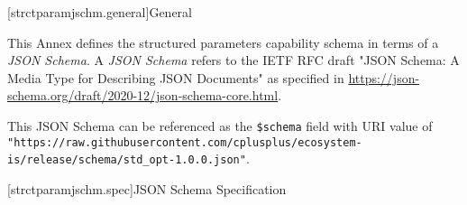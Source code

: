 

[strctparamjschm.general]{General}

\pnum
This Annex defines the structured parameters capability schema
 in terms of a \emph{JSON Schema}.
A \emph{JSON Schema} refers to the IETF RFC draft
"JSON Schema: A Media Type for Describing JSON Documents" as specified in
\url{https://json-schema.org/draft/2020-12/json-schema-core.html}.

\pnum
This JSON Schema can be referenced as the \verb|$schema| field with URI value
of \\
\verb|"https://raw.githubusercontent.com/cplusplus/ecosystem-is/release/schema/std_opt-1.0.0.json"|.

[strctparamjschm.spec]{JSON Schema Specification}

